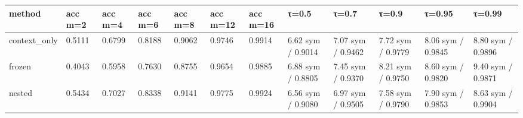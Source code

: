 \begin{tabular}{llllllllllll}
\hline
method & acc m=2 & acc m=4 & acc m=6 & acc m=8 & acc m=12 & acc m=16 & τ=0.5 & τ=0.7 & τ=0.9 & τ=0.95 & τ=0.99 \\
\hline
context\_only & 0.5111 & 0.6799 & 0.8188 & 0.9062 & 0.9746 & 0.9914 & 6.62 sym / 0.9014 & 7.07 sym / 0.9462 & 7.72 sym / 0.9779 & 8.06 sym / 0.9845 & 8.80 sym / 0.9896 \\
frozen & 0.4043 & 0.5958 & 0.7630 & 0.8755 & 0.9654 & 0.9885 & 6.88 sym / 0.8805 & 7.45 sym / 0.9370 & 8.21 sym / 0.9750 & 8.60 sym / 0.9820 & 9.40 sym / 0.9871 \\
nested & 0.5434 & 0.7027 & 0.8338 & 0.9141 & 0.9775 & 0.9924 & 6.56 sym / 0.9080 & 6.97 sym / 0.9505 & 7.58 sym / 0.9790 & 7.90 sym / 0.9853 & 8.63 sym / 0.9904 \\
\hline
\end{tabular}
